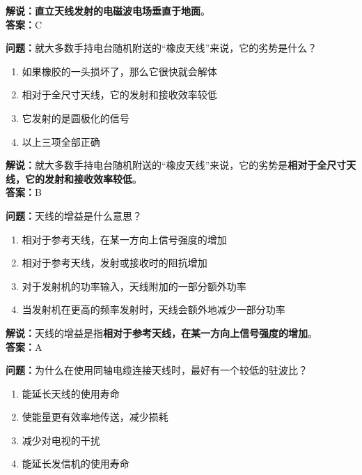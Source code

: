 \documentclass{ctexbook}
\begin{document}
\noindent\textbf{解说：}\textbf{直立天线发射的电磁波电场垂直于地面}。\\\noindent\textbf{答案：}C


\bigskip


\noindent\textbf{问题：}就大多数手持电台随机附送的“橡皮天线”来说，它的劣势是什么？

\begin{enumerate}[label=\Alph*), leftmargin=3em]
	\item 如果橡胶的一头损坏了，那么它很快就会解体
	\item 相对于全尺寸天线，它的发射和接收效率较低
	\item 它发射的是圆极化的信号
	\item 以上三项全部正确
\end{enumerate}

\noindent\textbf{解说：}就大多数手持电台随机附送的“橡皮天线”来说，它的劣势是\textbf{相对于全尺寸天线，它的发射和接收效率较低}。\\\noindent\textbf{答案：}B


\bigskip


\noindent\textbf{问题：}天线的增益是什么意思？

\begin{enumerate}[label=\Alph*), leftmargin=3em]
	\item 相对于参考天线，在某一方向上信号强度的增加
	\item 相对于参考天线，发射或接收时的阻抗增加
	\item 对于发射机的功率输入，天线附加的一部分额外功率
	\item 当发射机在更高的频率发射时，天线会额外地减少一部分功率
\end{enumerate}

\noindent\textbf{解说：}天线的增益是指\textbf{相对于参考天线，在某一方向上信号强度的增加}。\\\noindent\textbf{答案：}A


\bigskip


\noindent\textbf{问题：}为什么在使用同轴电缆连接天线时，最好有一个较低的驻波比？

\begin{enumerate}[label=\Alph*), leftmargin=3em]
	\item 能延长天线的使用寿命
	\item 使能量更有效率地传送，减少损耗
	\item 减少对电视的干扰
	\item 能延长发信机的使用寿命
\end{enumerate}
\end{document}
